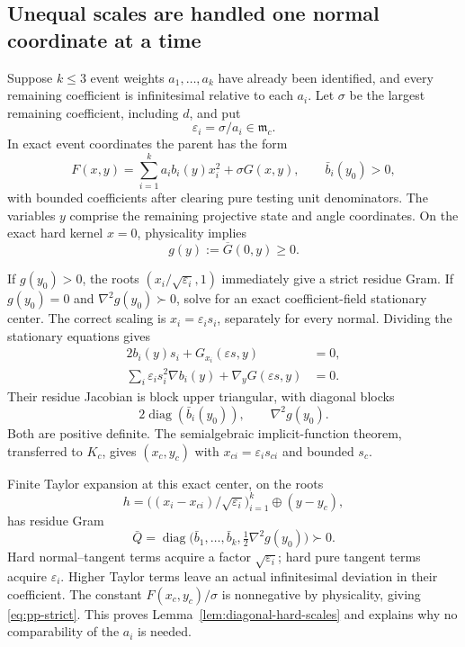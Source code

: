 \subsection{Unequal scales are handled one normal coordinate at a time}
Suppose $k\leq3$ event weights $a_1,\ldots,a_k$ have already been identified,
and every remaining coefficient is infinitesimal relative to each $a_i$.
Let $\sigma$ be the largest remaining coefficient, including $d$, and put
\[
 \varepsilon_i=\sigma/a_i\in\mathfrak m_c.
\]
In exact event coordinates the parent has the form
\begin{equation}\label{eq:pp-diagonal}
 F(x,y)=\sum_{i=1}^k a_i b_i(y)x_i^2+\sigma G(x,y),
 \qquad \bar b_i(y_0)>0,
\end{equation}
with bounded coefficients after clearing pure testing unit denominators.
The variables $y$ comprise the remaining projective state and angle
coordinates.  On the exact hard kernel $x=0$, physicality implies
\[
                         g(y):=\overline G(0,y)\geq0.
\]

If $g(y_0)>0$, the roots $(x_i/\sqrt{\varepsilon_i},1)$ immediately give a
strict residue Gram.  If $g(y_0)=0$ and $\nabla^2g(y_0)\succ0$, solve for an
exact coefficient-field stationary center.  The correct scaling is
$x_i=\varepsilon_i s_i$, separately for every normal.  Dividing the stationary
equations gives
\begin{align*}
 2b_i(y)s_i+G_{x_i}(\varepsilon s,y)&=0,\\
 \sum_i\varepsilon_i s_i^2\nabla b_i(y)
                 +\nabla_yG(\varepsilon s,y)&=0.
\end{align*}
Their residue Jacobian is block upper triangular, with diagonal blocks
\[
 2\operatorname{diag}(\bar b_i(y_0)),\qquad \nabla^2g(y_0).
\]
Both are positive definite.  The semialgebraic implicit-function theorem,
transferred to $K_c$, gives $(x_c,y_c)$ with
$x_{ci}=\varepsilon_i s_{ci}$ and bounded $s_c$.

Finite Taylor expansion at this exact center, on the roots
\[
 h=\big((x_i-x_{ci})/\sqrt{\varepsilon_i}\big)_{i=1}^k
                  \mathbin{\oplus}(y-y_c),
\]
has residue Gram
\[
 \bar Q=\operatorname{diag}
       \big(\bar b_1,\ldots,\bar b_k,\tfrac12\nabla^2g(y_0)\big)\succ0.
\]
Hard normal--tangent terms acquire a factor $\sqrt{\varepsilon_i}$;
hard pure tangent terms acquire $\varepsilon_i$.  Higher Taylor terms leave
an actual infinitesimal deviation in their coefficient.  The constant
$F(x_c,y_c)/\sigma$ is nonnegative by physicality, giving
\eqref{eq:pp-strict}.  This proves Lemma~\ref{lem:diagonal-hard-scales} and
explains why no comparability of the $a_i$ is needed.

